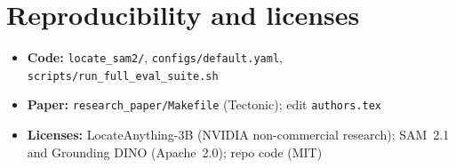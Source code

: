 \documentclass[11pt,a4paper]{article}
\begin{document}
\section*{Reproducibility and licenses}
\label{sec:repro}

\begin{itemize}
  \item \textbf{Code:} \texttt{locate\_sam2/}, \texttt{configs/default.yaml}, \texttt{scripts/run\_full\_eval\_suite.sh}
  \item \textbf{Paper:} \texttt{research\_paper/Makefile} (Tectonic); edit \texttt{authors.tex}
  \item \textbf{Licenses:} LocateAnything-3B (NVIDIA non-commercial research); SAM~2.1 and Grounding DINO (Apache~2.0); repo code (MIT)
\end{itemize}

\clearpage


\end{document}
